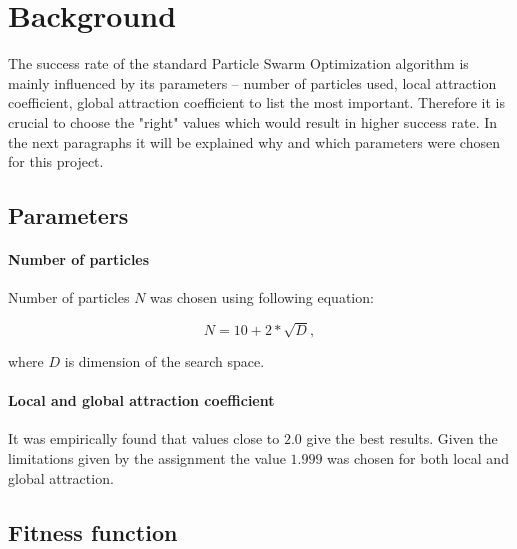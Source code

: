 \section{Background}
The success rate of the standard Particle Swarm Optimization algorithm is mainly influenced by its parameters -- number of particles used, local attraction coefficient, global attraction coefficient to list the most important. Therefore it is crucial to choose the "right" values which would result in higher success rate. In the next paragraphs it will be explained why and which parameters were chosen for this project.

\subsection{Parameters}

\paragraph{Number of particles} Number of particles $N$ was chosen using following equation:

\begin{equation}
N = 10 + 2*\sqrt{D},
\end{equation}

where $D$ is dimension of the search space.

\paragraph{Local and global attraction coefficient}
It was empirically found that values close to $2.0$ give the best results. Given the limitations given by the assignment the value $1.999$ was chosen for both local and global attraction.

\subsection{Fitness function}